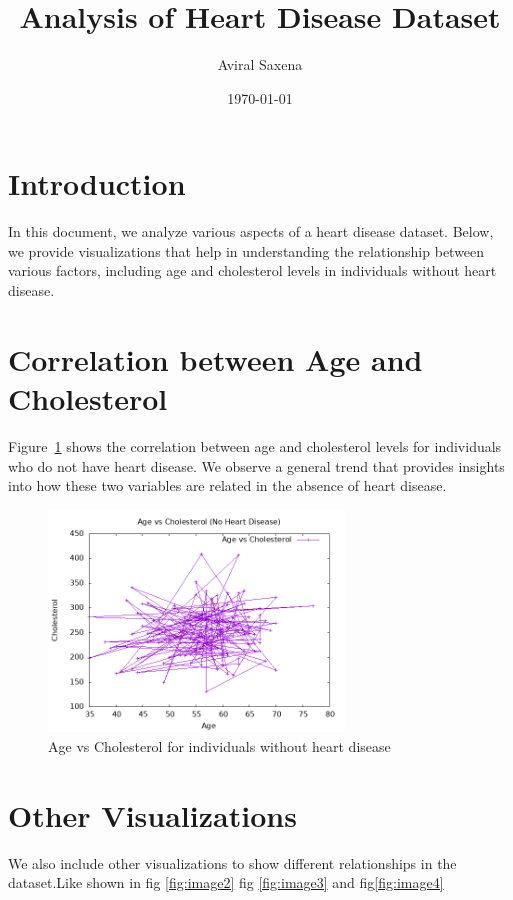\documentclass{article}
\title{Analysis of Heart Disease Dataset}
\author{Aviral Saxena}
\date{\today}
\begin{document}
	
	\maketitle
	
	\section{Introduction}
	
	In this document, we analyze various aspects of a heart disease dataset. Below, we provide visualizations that help in understanding the relationship between various factors, including age and cholesterol levels in individuals without heart disease.
	
	\section{Correlation between Age and Cholesterol}
	
	Figure~\ref{fig:age_vs_chol} shows the correlation between age and cholesterol levels for individuals who do not have heart disease. We observe a general trend that provides insights into how these two variables are related in the absence of heart disease.
	
	\begin{figure}[h!]
		\centering
		\includegraphics[width=0.7\textwidth]{ques4c.png}
		\caption{Age vs Cholesterol for individuals without heart disease}
		\label{fig:age_vs_chol}
	\end{figure}
	
	\section{Other Visualizations}
	
	We also include other visualizations to show different relationships in the dataset.Like shown in fig \ref{fig:image2} fig \ref{fig:image3} and fig\ref{fig:image4}
	
\end{document}
